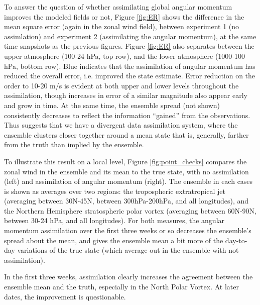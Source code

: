 To answer the question of whether assimilating global angular momentum improves the modeled fields or not, 
Figure \ref{fig:ER} shows the difference in the mean square error (again in the zonal wind field), between experiment 1 (no assimlation) and experiment 2 (assimilating the angular momentum), at the same time snapshots as the previous figures. 
Figure \ref{fig:ER} also separates between the upper atmosphere (100-24 hPa, top row), and the lower atmosphere (1000-100 hPa, bottom row). 
Blue indicates that the assimilation of angular momentum has reduced the overall error, i.e. improved the state estimate.
Error reduction on the order to 10-20 m/s is evident at both upper and lower levels throughout the assimilation, though increases in error of a similar magnitude also appear early and grow in time. 
At the same time, the ensemble spread (not shown) consistently decreases to reflect the information ``gained'' from the observations. 
Thus suggests that we have a divergent data assimilation system, where the ensemble clusters closer together around a mean state that is, generally, farther from the truth than implied by the ensemble. 

To illustrate this result on a local level, Figure \ref{fig:point_checks} compares the zonal wind in the ensemble and its mean to the true state, with no assimilation (left) and assimilation of angular momentum (right). 
The ensemble in each cases is shown as averages over two regions: the tropospheric extratropical jet (averaging between 30N-45N, between 300hPa-200hPa, and all longitudes), and the Northern Hemisphere stratospheric polar vortex (averaging between 60N-90N, between 30-24 hPa, and all longitudes).
For both measures, the angular momentum assimilation over the first three weeks or so decreases the ensemble's spread about the mean, and gives the ensemble mean a bit more of the day-to-day variations of the true state (which average out in the ensemble with not assimilation). 

In the first three weeks, assimilation clearly increases the agreement between the ensemble mean and the truth, especially in the North Polar Vortex. 
At later dates, the improvement is questionable. 

